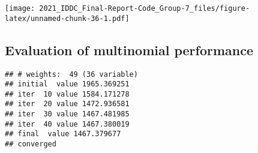 \documentclass[
]{article}
\newenvironment{Shaded}{\begin{snugshade}}{\end{snugshade}}
\newcommand{\CommentTok}[1]{\textcolor[rgb]{0.56,0.35,0.01}{\textit{#1}}}
\newcommand{\DataTypeTok}[1]{\textcolor[rgb]{0.13,0.29,0.53}{#1}}
\newcommand{\DecValTok}[1]{\textcolor[rgb]{0.00,0.00,0.81}{#1}}
\newcommand{\KeywordTok}[1]{\textcolor[rgb]{0.13,0.29,0.53}{\textbf{#1}}}
\newcommand{\NormalTok}[1]{#1}
\newcommand{\OperatorTok}[1]{\textcolor[rgb]{0.81,0.36,0.00}{\textbf{#1}}}
\newcommand{\StringTok}[1]{\textcolor[rgb]{0.31,0.60,0.02}{#1}}
\begin{document}
\texttt{[image: 2021\_IDDC\_Final-Report-Code\_Group-7\_files/figure-latex/unnamed-chunk-36-1.pdf]}

\hypertarget{evaluation-of-multinomial-performance}{%
\subsection{Evaluation of multinomial
performance}\label{evaluation-of-multinomial-performance}}

\begin{Shaded}
\end{Shaded}

\begin{verbatim}
## # weights:  49 (36 variable)
## initial  value 1965.369251 
## iter  10 value 1584.171278
## iter  20 value 1472.936581
## iter  30 value 1467.481985
## iter  40 value 1467.380019
## final  value 1467.379677 
## converged
\end{verbatim}
\end{document}
